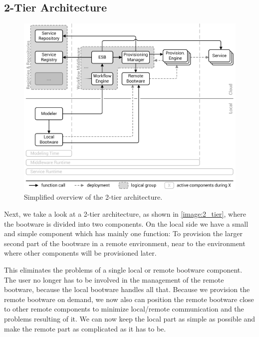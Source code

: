\subsection{2-Tier Architecture}
\label{design:division:2tier}

\begin{figure}[!htbp]
	\centering
	\includegraphics[resolution=600]{design/assets/2_tier}
	\caption{Simplified overview of the 2-tier architecture.}
	\label{image:2_tier}
\end{figure}

Next, we take a look at a 2-tier architecture, as shown in \autoref{image:2_tier}, where the bootware is divided into two components.
On the local side we have a small and simple component which has mainly one function: To provision the larger second part of the bootware in a remote environment, near to the environment where other components will be provisioned later.

\pagebreak

This eliminates the problems of a single local or remote bootware component.
The user no longer has to be involved in the management of the remote bootware, because the local bootware handles all that.
Because we provision the remote bootware on demand, we now also can position the remote bootware close to other remote components to minimize local/remote communication and the problems resulting of it.
We can now keep the local part as simple as possible and make the remote part as complicated as it has to be.

